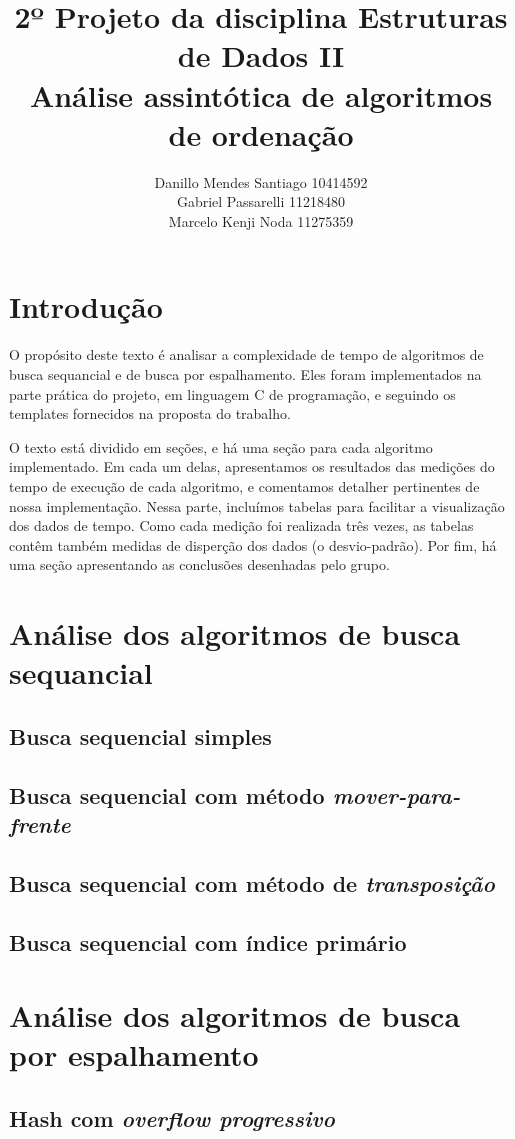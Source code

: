 \documentclass{article}
\title{%
    2º Projeto da disciplina Estruturas de Dados II \\
     \large Análise assintótica de algoritmos de ordenação}
\author{Danillo Mendes Santiago 10414592\\Gabriel Passarelli 11218480\\ Marcelo Kenji Noda 11275359}
\begin{document}
%
\maketitle
%
\section{Introdução}
O propósito deste texto é analisar a complexidade de tempo de algoritmos de busca sequancial e de busca por espalhamento. Eles foram implementados na parte prática do projeto, em linguagem C de programação, e seguindo os templates fornecidos na proposta do trabalho.\par
%
O texto está dividido em seções, e há uma seção para cada algoritmo implementado. Em cada um delas, apresentamos os resultados das medições do tempo de execução de cada algoritmo, e comentamos detalher pertinentes de nossa implementação. Nessa parte, incluímos tabelas para facilitar a visualização dos dados de tempo. Como cada medição foi realizada três vezes, as tabelas contêm também medidas de disperção dos dados (o desvio-padrão). Por fim, há uma seção apresentando as conclusões desenhadas pelo grupo.
%
\section{Análise dos algoritmos de busca sequancial}
\subsection{Busca sequencial simples}
%
%
%
\subsection{Busca sequencial com método \textit{mover-para-frente}}
%
%
%
\subsection{Busca sequencial com método de \textit{transposição}}
%
%
%
\subsection{Busca sequencial com índice primário}
%
%
%
\section{Análise dos algoritmos de busca por espalhamento}
\subsection{Hash com \textit{overflow progressivo}}
%
%
%
\end{document}
